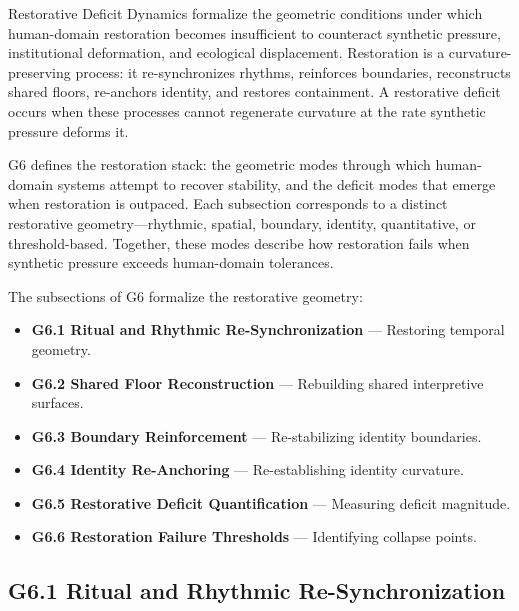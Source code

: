 
\medskip

\noindent Restorative Deficit Dynamics formalize the geometric conditions under
which human-domain restoration becomes insufficient to counteract synthetic
pressure, institutional deformation, and ecological displacement. Restoration is
a curvature-preserving process: it re-synchronizes rhythms, reinforces
boundaries, reconstructs shared floors, re-anchors identity, and restores
containment. A restorative deficit occurs when these processes cannot regenerate
curvature at the rate synthetic pressure deforms it.

\medskip

\noindent G6 defines the restoration stack: the geometric modes through which
human-domain systems attempt to recover stability, and the deficit modes that
emerge when restoration is outpaced. Each subsection corresponds to a distinct
restorative geometry—rhythmic, spatial, boundary, identity, quantitative, or
threshold-based. Together, these modes describe how restoration fails when
synthetic pressure exceeds human-domain tolerances.

\medskip

\noindent The subsections of G6 formalize the restorative geometry:

\begin{itemize}[leftmargin=1.2cm]
    \item \textbf{G6.1 Ritual and Rhythmic Re-Synchronization} — Restoring
    temporal geometry.
    \item \textbf{G6.2 Shared Floor Reconstruction} — Rebuilding shared
    interpretive surfaces.
    \item \textbf{G6.3 Boundary Reinforcement} — Re-stabilizing identity
    boundaries.
    \item \textbf{G6.4 Identity Re-Anchoring} — Re-establishing identity
    curvature.
    \item \textbf{G6.5 Restorative Deficit Quantification} — Measuring deficit
    magnitude.
    \item \textbf{G6.6 Restoration Failure Thresholds} — Identifying collapse
    points.
\end{itemize}

\medskip

\subsection*{G6.1 Ritual and Rhythmic Re-Synchronization}

